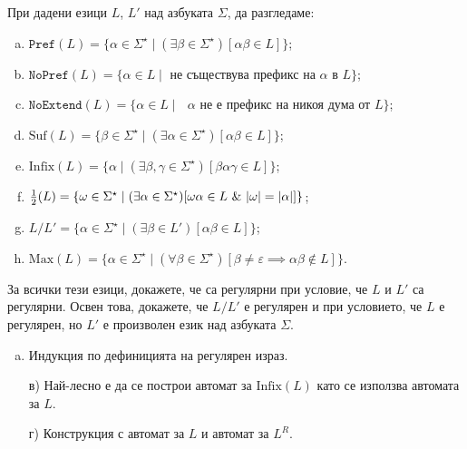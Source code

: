 \begin{problem}
  При дадени езици $L$, $L'$ над азбуката $\Sigma$, да разгледаме:
  \begin{enumerate}[a)]
  \item
    $\texttt{Pref}(L) = \{\alpha \in \Sigma^\star \mid (\exists \beta \in \Sigma^\star)[\alpha\beta \in L]\}$;
  \item
    $\texttt{NoPref}(L) = \{\alpha \in L \mid \text{ не съществува префикс на $\alpha$ в $L$}\}$;
  \item
    $\texttt{NoExtend}(L) = \{\alpha \in L \mid \text{ $\alpha$ не е префикс на никоя дума от $L$}\}$;
  \item
    $\mbox{Suf}(L) = \{\beta \in \Sigma^\star \mid (\exists \alpha \in \Sigma^\star)[\alpha\beta \in L]\}$;
  \item
    $\text{Infix}(L) = \{\alpha \mid (\exists \beta,\gamma \in \Sigma^\star)[\beta\alpha\gamma \in L]\}$;
  \item 
    $\frac{1}{2}(L) = \{\omega \in \Sigma^\star \mid (\exists \alpha \in \Sigma^\star)[\omega\alpha \in L\ \&\ \abs{\omega} = \abs{\alpha}]\}$;
  \item
    $L/L' = \{\alpha \in \Sigma^\star \mid (\exists \beta \in L')[\alpha\beta \in L]\}$;
  \item
    $\mbox{Max}(L) = \{\alpha \in \Sigma^\star \mid (\forall \beta\in\Sigma^\star)[\beta \neq \varepsilon\implies \alpha\beta \not\in L]\}$.
  \end{enumerate}
  За всички тези езици, докажете, че са регулярни при условие, че $L$ и $L'$ са регулярни.
  Освен това, докажете, че $L/L'$ е регулярен и при условието, че $L$ е регулярен, но $L'$ е произволен език над азбуката $\Sigma$.
\end{problem}
\begin{hint}
  \begin{enumerate}[a)]
  \item 
    Индукция по дефиницията на регулярен израз.
  \item[в)]
    Най-лесно е да се построи автомат за $\text{Infix}(L)$ като се използва автомата за $L$.
  \item[г)]
    Конструкция с автомат за $L$ и автомат за $L^R$.
  \end{enumerate}
\end{hint}

